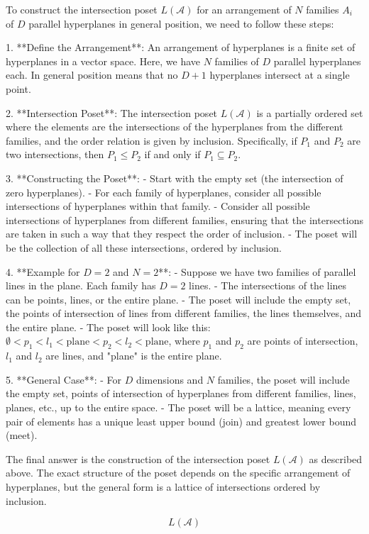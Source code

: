 To construct the intersection poset \( L(\mathcal{A}) \) for an arrangement of \( N \) families \( A_i \) of \( D \) parallel hyperplanes in general position, we need to follow these steps:

1. **Define the Arrangement**: An arrangement of hyperplanes is a finite set of hyperplanes in a vector space. Here, we have \( N \) families of \( D \) parallel hyperplanes each. In general position means that no \( D+1 \) hyperplanes intersect at a single point.

2. **Intersection Poset**: The intersection poset \( L(\mathcal{A}) \) is a partially ordered set where the elements are the intersections of the hyperplanes from the different families, and the order relation is given by inclusion. Specifically, if \( P_1 \) and \( P_2 \) are two intersections, then \( P_1 \leq P_2 \) if and only if \( P_1 \subseteq P_2 \).

3. **Constructing the Poset**:
   - Start with the empty set (the intersection of zero hyperplanes).
   - For each family of hyperplanes, consider all possible intersections of hyperplanes within that family.
   - Consider all possible intersections of hyperplanes from different families, ensuring that the intersections are taken in such a way that they respect the order of inclusion.
   - The poset will be the collection of all these intersections, ordered by inclusion.

4. **Example for \( D = 2 \) and \( N = 2 \)**:
   - Suppose we have two families of parallel lines in the plane. Each family has \( D = 2 \) lines.
   - The intersections of the lines can be points, lines, or the entire plane.
   - The poset will include the empty set, the points of intersection of lines from different families, the lines themselves, and the entire plane.
   - The poset will look like this: \(\emptyset < p_1 < l_1 < \text{plane} < p_2 < l_2 < \text{plane}\), where \( p_1 \) and \( p_2 \) are points of intersection, \( l_1 \) and \( l_2 \) are lines, and "plane" is the entire plane.

5. **General Case**:
   - For \( D \) dimensions and \( N \) families, the poset will include the empty set, points of intersection of hyperplanes from different families, lines, planes, etc., up to the entire space.
   - The poset will be a lattice, meaning every pair of elements has a unique least upper bound (join) and greatest lower bound (meet).

The final answer is the construction of the intersection poset \( L(\mathcal{A}) \) as described above. The exact structure of the poset depends on the specific arrangement of hyperplanes, but the general form is a lattice of intersections ordered by inclusion.

\[
\boxed{L(\mathcal{A})}
\]